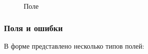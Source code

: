 	\begin{figure}[H]
		\caption{Поле }
		\label{university:is_consumer}
	\end{figure}	
	
	\subsubsection{Поля и ошибки}
	В форме представлено несколько типов полей:
